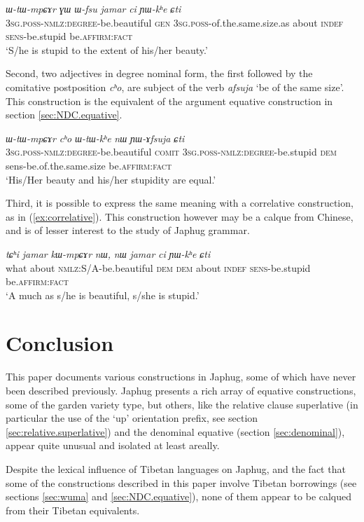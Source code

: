 \documentclass[oneside,a4paper,12pt]{article}
\newcommand{\ipa}[1]{{\phon\textit{#1}}}
\newcommand{\forme}[2]{\ipa{#1} `#2'}
\begin{document}
\begin{exe}
\ex 
\gll 
\ipa{ɯ-tɯ-mpɕɤr} \ipa{ɣɯ} 	\ipa{ɯ-fsu} 	\ipa{jamar} 	\ipa{ci} 	\ipa{ɲɯ-kʰe} 	\ipa{ɕti} \\
\textsc{3sg.poss-nmlz:degree}-be.beautiful \textsc{gen} \textsc{3sg.poss}-of.the.same.size.as about \textsc{indef} \textsc{sens}-be.stupid be.\textsc{affirm:fact} \\
\glt `S/he is stupid to the extent of his/her beauty.'
\end{exe}

Second, two adjectives in degree nominal form, the first followed by the comitative postposition \ipa{cʰo}, are subject of the verb \forme{afsuja}{be of the same size}. This construction is the equivalent of the argument equative construction in section \ref{sec:NDC.equative}.

\begin{exe}
\ex \label{ex:YAfsuja}
\gll 
\ipa{ɯ-tɯ-mpɕɤr} 	\ipa{cʰo} 	\ipa{ɯ-tɯ-kʰe} 	\ipa{nɯ} 	\ipa{ɲɯ-ɤfsuja} 	\ipa{ɕti} \\
\textsc{3sg.poss-nmlz:degree}-be.beautiful \textsc{comit} \textsc{3sg.poss-nmlz:degree}-be.stupid \textsc{dem} sens-be.of.the.same.size be.\textsc{affirm:fact} \\
\glt `His/Her beauty and his/her stupidity are equal.'
\end{exe}

Third, it is possible to express the same meaning with a correlative construction, as in (\ref{ex:correlative}). This construction however may be a calque from Chinese, and is of lesser interest to the study of Japhug grammar.

\begin{exe}
\ex \label{ex:correlative}
\gll 
\ipa{tɕʰi} 	\ipa{jamar} 	\ipa{kɯ-mpɕɤr} 	\ipa{nɯ,} 	\ipa{nɯ} 	\ipa{jamar} 	\ipa{ci} 	\ipa{ɲɯ-kʰe} 	\ipa{ɕti} \\
what about \textsc{nmlz}:S/A-be.beautiful \textsc{dem} \textsc{dem} about \textsc{indef} \textsc{sens}-be.stupid be.\textsc{affirm:fact} \\
\glt `A much as s/he is beautiful, s/she is stupid.'
\end{exe}



\section*{Conclusion}
This paper documents various constructions in Japhug, some of which have never been described previously. Japhug presents a rich array of equative constructions, some of the garden variety type, but others, like the relative clause superlative (in particular the use of the `up' orientation prefix, see section \ref{sec:relative.superlative}) and the denominal equative (section \ref{sec:denominal}), appear quite unusual and isolated at least areally.

Despite the lexical influence of Tibetan languages on Japhug, and the fact that some of the constructions described in this paper involve Tibetan borrowings (see sections \ref{sec:wuma} and \ref{sec:NDC.equative}), none of them appear to be calqued from their Tibetan equivalents.



\end{document}

